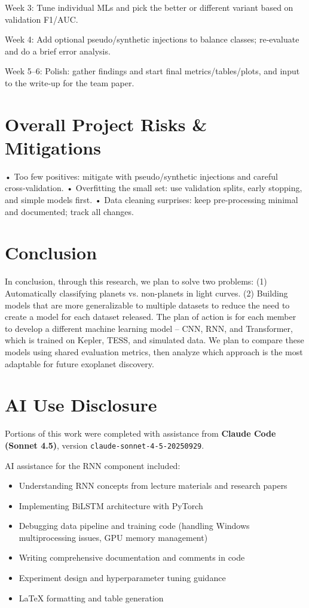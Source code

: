 \documentclass[letterpaper]{article} %
\begin{document}
Week 3: Tune individual MLs and pick the better or different variant based on validation F1/AUC.

Week 4: Add optional pseudo/synthetic injections to balance classes; re‑evaluate and do a brief error analysis.

Week 5–6: Polish: gather findings and start final metrics/tables/plots, and input to the write‑up for the team paper.

\section*{Overall Project Risks \& Mitigations}
• Too few positives: mitigate with pseudo/synthetic injections and careful cross‑validation.
• Overfitting the small set: use validation splits, early stopping, and simple models first.
• Data cleaning surprises: keep pre-processing minimal and documented; track all changes.

\section*{Conclusion}
In conclusion, through this research, we plan to solve two problems: (1) Automatically classifying planets vs. non-planets in light curves. (2) Building models that are more generalizable to multiple datasets to reduce the need to create a model for each dataset released. The plan of action is for each member to develop a different machine learning model – CNN, RNN, and Transformer, which is trained on Kepler, TESS, and simulated data. We plan to compare these models using shared evaluation metrics, then analyze which approach is the most adaptable for future exoplanet discovery.

\section*{AI Use Disclosure}

Portions of this work were completed with assistance from \textbf{Claude Code (Sonnet 4.5)}, version \texttt{claude-sonnet-4-5-20250929}.

AI assistance for the RNN component included:
\begin{itemize}
\item Understanding RNN concepts from lecture materials and research papers
\item Implementing BiLSTM architecture with PyTorch
\item Debugging data pipeline and training code (handling Windows multiprocessing issues, GPU memory management)
\item Writing comprehensive documentation and comments in code
\item Experiment design and hyperparameter tuning guidance
\item LaTeX formatting and table generation
\end{itemize}
\end{document}

